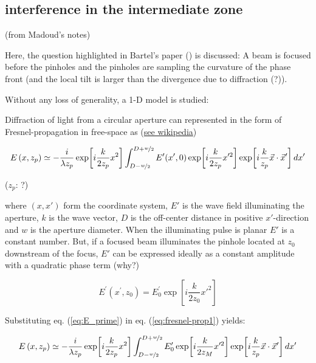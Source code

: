 \documentclass{article}
\begin{document}
\subsection{interference in the intermediate zone}

(from Madoud's notes)

Here, the question highlighted in Bartel’s paper (\cite[p.378, par.1]{BartelsPaulGreenEtAl2002}) is discussed: A beam is focused before the pinholes and the pinholes are sampling the curvature of the phase front (and the local tilt is larger than the divergence due to diffraction (?)).

Without any loss of generality, a 1-D model is studied:

Diffraction of light from a circular aperture can represented in the form of Fresnel-propagation in free-space as (\href{https://en.wikipedia.org/wiki/Fresnel_diffraction#The_Fresnel_diffraction_integral}{see wikipedia})

\begin{equation}\label{eq:fresnel-prop1}
	E\left(x, z_p \right)  \simeq - \frac{i}{\lambda z_p} \exp\!\left[ i \frac{k}{2 z_p} x^2 \right] \int_{D-\nicefrac{w}{2}}^{D+\nicefrac{w}{2}}  E^\prime (x', 0)  \exp\!\left[ i \frac{k}{2 z_p} x'^2 \right]  \exp\!\left[ i \frac{k}{z_p} \vec{x} \cdot \vec{x}'  \right]  \mathop{dx'}
\end{equation}

($ z_p $: ?)

where $ (x,x') $ form the coordinate system, $ E' $ is the wave field illuminating the aperture, $ k $ is the wave vector, $ D $ is the off-center distance in positive $ x' $-direction and $ w $ is the aperture diameter. When the illuminating pulse is planar $ E' $ is a constant number. But, if a focused beam illuminates the pinhole located at $ z_0 $ downstream of the focus, $ E' $  can be expressed ideally as a constant amplitude with a quadratic phase term (why?)

\begin{equation}\label{eq:E_prime}
E^\prime(x^\prime, z_0) = E^\prime_0 \exp\!\left[ i \frac{k}{2 z_0} x'^2 \right]
\end{equation}

Substituting eq. (\ref{eq:E_prime}) in eq. (\ref{eq:fresnel-prop1}) yields:

\begin{equation}\label{eq:fresnel-prop2}
E\left(x, z_p \right)  \simeq - \frac{i}{\lambda z_p} \exp\!\left[ i \frac{k}{2 z_p} x^2 \right] \int_{D-\nicefrac{w}{2}}^{D+\nicefrac{w}{2}}  E^\prime_0 \exp\!\left[ i \frac{k}{2 z_M} x'^2 \right]  \exp\!\left[ i \frac{k}{z_p} \vec{x} \cdot \vec{x}'  \right]  \mathop{dx'}
\end{equation}
\end{document}
